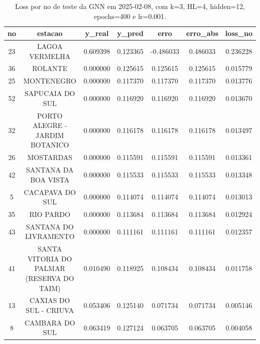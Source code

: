 \begin{table}[h]
\centering
\caption{Loss por no de teste da GNN em 2025-02-08, com k=3, HL=4, hidden=12, epochs=400 e lr=0.001.}
\label{tab:gnn_loss_k3_hl4_h12_e400_d20250208}
\begin{tabular}{ccccccc}
\toprule
no & estacao & y\_real & y\_pred & erro & erro\_abs & loss\_no \\
\midrule
23 & LAGOA VERMELHA & 0.609398 & 0.123365 & -0.486033 & 0.486033 & 0.236228 \\
36 & ROLANTE & 0.000000 & 0.125615 & 0.125615 & 0.125615 & 0.015779 \\
25 & MONTENEGRO & 0.000000 & 0.117370 & 0.117370 & 0.117370 & 0.013776 \\
52 & SAPUCAIA DO SUL & 0.000000 & 0.116920 & 0.116920 & 0.116920 & 0.013670 \\
32 & PORTO ALEGRE - JARDIM BOTANICO & 0.000000 & 0.116178 & 0.116178 & 0.116178 & 0.013497 \\
26 & MOSTARDAS & 0.000000 & 0.115591 & 0.115591 & 0.115591 & 0.013361 \\
42 & SANTANA DA BOA VISTA & 0.000000 & 0.115533 & 0.115533 & 0.115533 & 0.013348 \\
5 & CACAPAVA DO SUL & 0.000000 & 0.114074 & 0.114074 & 0.114074 & 0.013013 \\
35 & RIO PARDO & 0.000000 & 0.113684 & 0.113684 & 0.113684 & 0.012924 \\
43 & SANTANA DO LIVRAMENTO & 0.000000 & 0.111161 & 0.111161 & 0.111161 & 0.012357 \\
41 & SANTA VITORIA DO PALMAR (RESERVA DO TAIM) & 0.010490 & 0.118925 & 0.108434 & 0.108434 & 0.011758 \\
13 & CAXIAS DO SUL - CRIUVA & 0.053406 & 0.125140 & 0.071734 & 0.071734 & 0.005146 \\
8 & CAMBARA DO SUL & 0.063419 & 0.127124 & 0.063705 & 0.063705 & 0.004058 \\
\bottomrule
\end{tabular}
\end{table}
